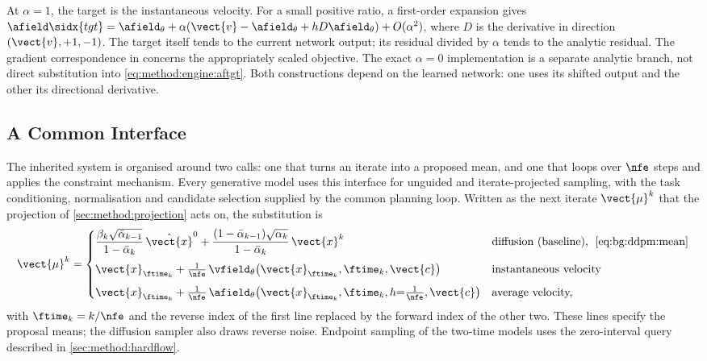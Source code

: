 At $\alpha=1$, the target is the instantaneous velocity. For a small positive ratio, a first-order
expansion gives $\afield\sidx{tgt}=\afield_{\theta}
+\alpha(\vect{v}-\afield_{\theta}+hD\afield_{\theta})+O(\alpha^2)$, where $D$ is the derivative
in direction $(\vect{v},+1,-1)$. The target itself tends to the current network output;
its residual divided by $\alpha$ tends to the analytic residual. The gradient correspondence in
\parencite[Thm.~1]{zhang2025alphaflow} concerns the appropriately scaled objective. The exact
$\alpha=0$ implementation is a separate analytic branch, not direct substitution into
\eqref{eq:method:engine:aftgt}. Both constructions depend on the learned network: one uses its
shifted output and the other its directional derivative.

\subsection{A Common Interface}\label{sec:method:interface}

The inherited system is organised around two calls: one that turns an iterate into a proposed
mean, and one that loops over $\nfe$ steps and applies the constraint mechanism. Every generative model
uses this interface for unguided and iterate-projected sampling, with the task
conditioning, normalisation and candidate selection supplied by the common planning loop. Written as the next iterate $\vect{\mu}^{k}$ that the projection of
\autoref{sec:method:projection} acts on, the substitution is
\begin{equation}\label{eq:method:engine:iface}
  \vect{\mu}^{k}
  = \begin{cases}
      \dfrac{\beta_{k}\sqrt{\bar{\alpha}_{k-1}}}{1-\bar{\alpha}_{k}}\,\hat{\vect{x}}^{0}
        + \dfrac{(1-\bar{\alpha}_{k-1})\sqrt{\alpha_{k}}}{1-\bar{\alpha}_{k}}\,\vect{x}^{k}
        & \text{diffusion (baseline),\; \eqref{eq:bg:ddpm:mean}}\\[10pt]
      \vect{x}_{\ftime_{k}} + \tfrac{1}{\nfe}\,
        \vfield_{\theta}\!\left(\vect{x}_{\ftime_{k}},\ftime_{k},\vect{c}\right)
        & \text{instantaneous velocity}\\[6pt]
      \vect{x}_{\ftime_{k}} + \tfrac{1}{\nfe}\,
        \afield_{\theta}\!\left(\vect{x}_{\ftime_{k}},\ftime_{k},h{=}\tfrac{1}{\nfe},\vect{c}\right)
        & \text{average velocity,}
    \end{cases}
\end{equation}
with $\ftime_{k} = k/\nfe$ and the reverse index of the first line replaced by the forward index
of the other two. These lines specify the proposal means; the diffusion sampler also draws reverse
noise. Endpoint sampling of the two-time models uses the zero-interval query described in
\autoref{sec:method:hardflow}.

